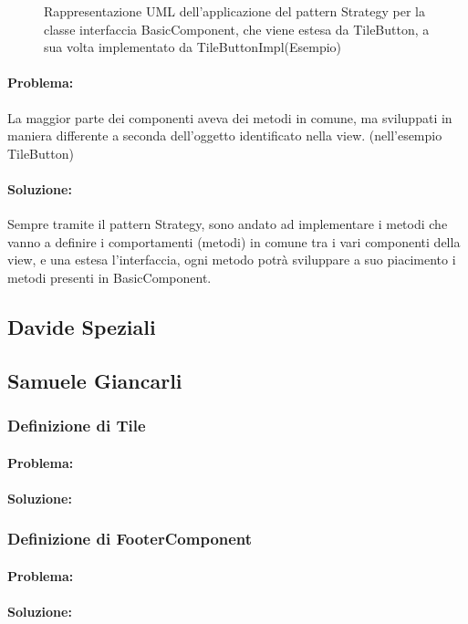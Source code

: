 \begin{figure}[ht]
    \caption{Rappresentazione UML dell'applicazione del pattern Strategy per la classe interfaccia BasicComponent, che viene estesa da TileButton, a sua volta implementato da TileButtonImpl(Esempio)}
\end{figure}

\paragraph{Problema:}
La maggior parte dei componenti aveva dei metodi in comune, ma sviluppati in maniera differente a seconda dell'oggetto identificato nella view. (nell'esempio TileButton)
\paragraph{Soluzione:}
Sempre tramite il pattern Strategy, sono andato ad implementare i metodi che vanno a definire i comportamenti (metodi) in comune tra i vari componenti della view, e una estesa l'interfaccia, ogni metodo potrà sviluppare a suo piacimento i metodi presenti in BasicComponent.

\subsection*{Davide Speziali}

\subsection*{Samuele Giancarli}
\subsubsection*{Definizione di Tile}
\paragraph{Problema:}
\paragraph{Soluzione:}

\subsubsection*{Definizione di FooterComponent}
\paragraph{Problema:}
\paragraph{Soluzione:}


